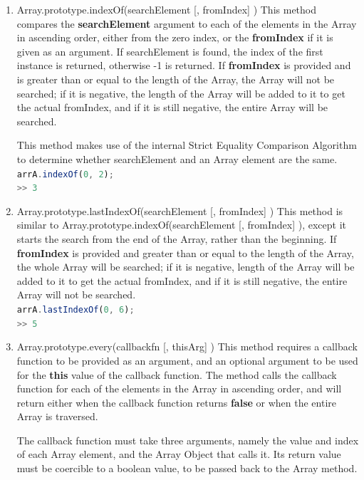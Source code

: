 \documentclass[a4paper,11pt,twoside]{report}
\def\jsinline{\lstinline[language=JavaScript, basicstyle=\small]}%\end{lstlisting}
\begin{document}
\begin{enumerate}
\item Array.prototype.indexOf(searchElement [, fromIndex] ) \newline
This method compares the \textbf{searchElement} argument to each of the elements in the Array in ascending order, either from the zero index, or the \textbf{fromIndex} if it is given as an argument. If searchElement is found, the index of the first instance is returned, otherwise -1 is returned. If \textbf{fromIndex} is provided and is greater than or equal to the length of the Array, the Array will not be searched; if it is negative, the length of the Array will be added to it to get the actual fromIndex, and if it is still negative, the entire Array will be searched.

This method makes use of the internal Strict Equality Comparison Algorithm to determine whether searchElement and an Array element are the same.\\
\jsinline|arrA.indexOf(0, 2);|\\
\jsinline|>> 3|

\item Array.prototype.lastIndexOf(searchElement [, fromIndex] ) \newline
This method is similar to Array.prototype.indexOf(searchElement [, fromIndex] ), except it starts the search from the end of the Array, rather than the beginning. If \textbf{fromIndex} is provided and greater than or equal to the length of the Array, the whole Array will be searched; if it is negative, length of the Array will be added to it to get the actual fromIndex, and if it is still negative, the entire Array will not be searched.\\
\jsinline|arrA.lastIndexOf(0, 6);|\\
\jsinline|>> 5|

\item Array.prototype.every(callbackfn [, thisArg] ) \newline
This method requires a callback function to be provided as an argument, and an optional argument to be used for the \textbf{this} value of the callback function. The method calls the callback function for each of the elements in the Array in ascending order, and will return either when the callback function returns \textbf{false} or when the entire Array is traversed.

The callback function must take three arguments, namely the value and index of each Array element, and the Array Object that calls it. Its return value must be coercible to a boolean value, to be passed back to the Array method.


\end{enumerate}
\end{document}
